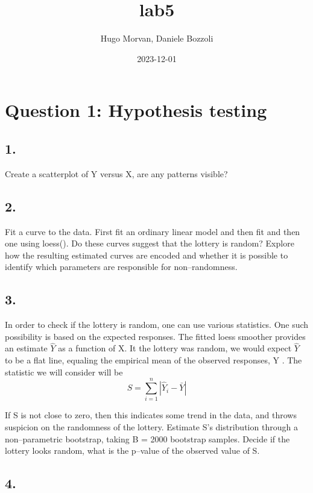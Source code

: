 \documentclass[
]{article}
\title{lab5}
\author{Hugo Morvan, Daniele Bozzoli}
\date{2023-12-01}
\begin{document}
\maketitle

\hypertarget{question-1-hypothesis-testing}{%
\section{Question 1: Hypothesis
testing}\label{question-1-hypothesis-testing}}

\hypertarget{section}{%
\subsection{1.}\label{section}}

Create a scatterplot of Y versus X, are any patterns visible?

\hypertarget{section-1}{%
\subsection{2.}\label{section-1}}

Fit a curve to the data. First fit an ordinary linear model and then fit
and then one using loess(). Do these curves suggest that the lottery is
random? Explore how the resulting estimated curves are encoded and
whether it is possible to identify which parameters are responsible for
non--randomness.

\hypertarget{section-2}{%
\subsection{3.}\label{section-2}}

In order to check if the lottery is random, one can use various
statistics. One such possibility is based on the expected responses. The
fitted loess smoother provides an estimate \(\hat{Y}\) as a function of
X. It the lottery was random, we would expect \(\hat{Y}\) to be a flat
line, equaling the empirical mean of the observed responses, Y . The
statistic we will consider will be
\[ S = \sum_{i=1}^{n}|\hat{Y}_i-\bar{Y}| \]

If S is not close to zero, then this indicates some trend in the data,
and throws suspicion on the randomness of the lottery. Estimate S's
distribution through a non--parametric bootstrap, taking B = 2000
bootstrap samples. Decide if the lottery looks random, what is the
p--value of the observed value of S.

\hypertarget{section-3}{%
\subsection{4.}\label{section-3}}
\end{document}
